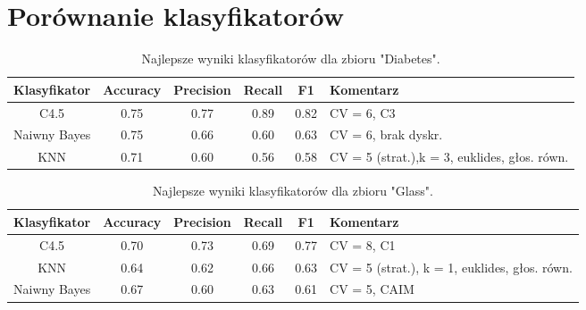 \pagebreak
\section{Porównanie klasyfikatorów}

    \begin{table}[H]
        \center
        \begin{tabular}{|c|cccc|p{3.5cm}|}
            \hline
            Klasyfikator & Accuracy & Precision & Recall & F1     & Komentarz \\ \hline
            C4.5         & 0.75     & 0.77      & 0.89   & 0.82   & CV = 6, C3 \\ \hline
            Naiwny Bayes & 0.75     & 0.66      & 0.60   & 0.63   & CV = 6, brak dyskr. \\ \hline
            KNN          & 0.71     & 0.60      & 0.56   & 0.58   & CV = 5 (strat.),\linebreak k = 3, euklides, \linebreak głos. równ. \\ \hline
        \end{tabular}
        \caption{Najlepsze wyniki klasyfikatorów dla zbioru "Diabetes".}
    \end{table}


    \begin{table}[H]
        \center
        \begin{tabular}{|c|cccc|p{3.5cm}|}
            \hline
            Klasyfikator & Accuracy & Precision & Recall & F1     & Komentarz \\ \hline
            C4.5         & 0.70     & 0.73      & 0.69   & 0.77   & CV = 8, C1 \\ \hline
            KNN          & 0.64     & 0.62      & 0.66   & 0.63   & CV = 5 (strat.), \linebreak k = 1, euklides, \linebreak głos. równ. \\ \hline
            Naiwny Bayes & 0.67     & 0.60      & 0.63   & 0.61   & CV = 5, CAIM \\ \hline
        \end{tabular}
        \caption{Najlepsze wyniki klasyfikatorów dla zbioru "Glass".}
    \end{table}


